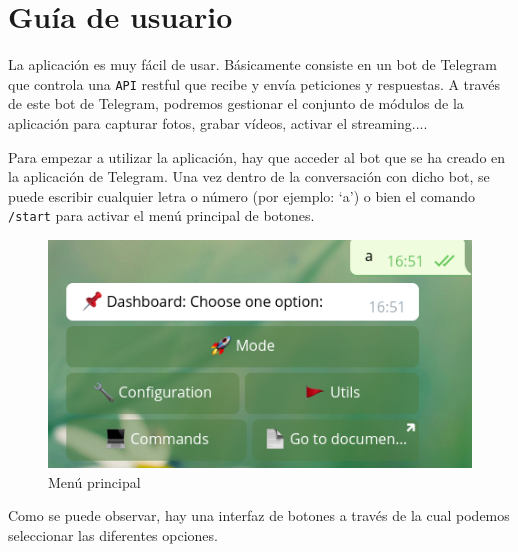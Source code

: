 \section{Guía de usuario} \label{anex:guia}

La aplicación es muy fácil de usar. Básicamente consiste en un bot de Telegram que controla una \texttt{API} restful que recibe y envía peticiones y respuestas. A través de este bot de Telegram, podremos gestionar el conjunto de módulos de la aplicación para capturar fotos, grabar vídeos, activar el streaming....

Para empezar a utilizar la aplicación, hay que acceder al bot que se ha creado en la aplicación de Telegram. Una vez dentro de la conversación con dicho bot, se puede escribir cualquier letra o número (por ejemplo: `a') o bien el comando \texttt{/start} para activar el menú principal de botones.

\begin{figure}[H]
	\centering
	\includegraphics[scale=0.5]{images/59}
	\caption{Menú principal}
\end{figure}

Como se puede observar, hay una interfaz de botones a través de la cual podemos seleccionar las diferentes opciones.

\vspace{-0.4cm}

